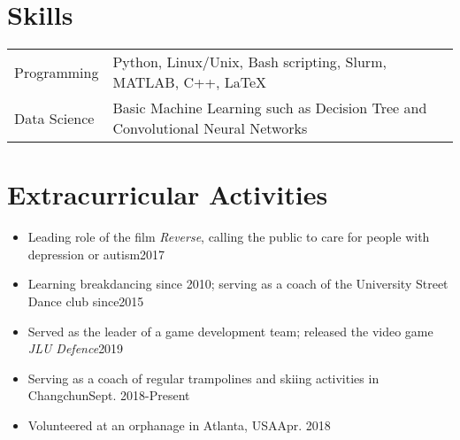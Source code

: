 \documentclass[a4paper,12pt]{article}
\begin{document}
\section{Skills}
\begin{tabularx}{\linewidth}{@{}l X@{}}
Programming &  \normalsize{Python, Linux/Unix, Bash scripting, Slurm, MATLAB, C++, \LaTeX}\\
Data Science &  \normalsize{Basic Machine Learning such as Decision Tree and Convolutional Neural Networks}\\  
\end{tabularx}


\section{Extracurricular Activities}

\begin{itemize}[leftmargin=0cm]
\setlength{\itemsep}{-5pt}
\item[] {Leading role} of the film \textit{Reverse}, calling the public to care for people with depression or autism\hfill 2017
\item[] Learning {breakdancing} since 2010; serving as a coach of the University {Street Dance} club since\hfill 2015
\item[] Served as the leader of a game development team; released the video game \textit{JLU Defence}\hfill 2019
\item[] Serving as a coach of regular trampolines and skiing activities in Changchun\hfill Sept. 2018-Present
\item[] Volunteered at an orphanage in Atlanta, USA\hfill Apr. 2018
\end{itemize}




\end{document}
